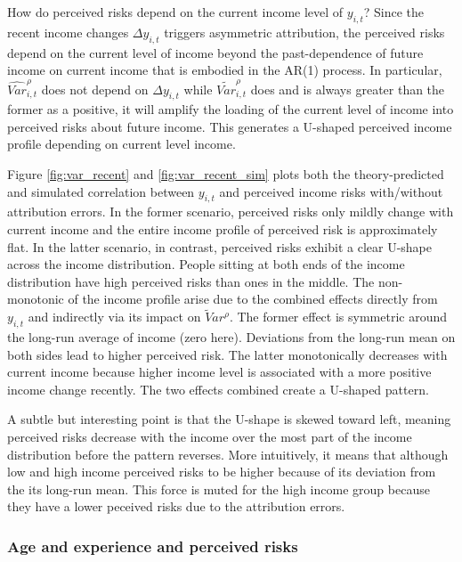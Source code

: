 \documentclass[12pt,notitlepage,onecolumn,aps,pra]{article}
\begin{document}
How do perceived risks depend on the current income level of
\(y_{i,t}\)? Since the recent income changes \(\Delta y_{i,t}\) triggers
asymmetric attribution, the perceived risks depend on the current level
of income beyond the past-dependence of future income on current income
that is embodied in the AR(1) process. In particular,
\(\widehat{Var}^\rho_{i,t}\) does not depend on \(\Delta y_{i,t}\) while
\(\tilde{Var}^\rho_{i,t}\) does and is always greater than the former as
a positive, it will amplify the loading of the current level of income
into perceived risks about future income. This generates a U-shaped
perceived income profile depending on current level income.

Figure \ref{fig:var_recent} and \ref{fig:var_recent_sim} plots both the
theory-predicted and simulated correlation between \(y_{i,t}\) and
perceived income risks with/without attribution errors. In the former
scenario, perceived risks only mildly change with current income and the
entire income profile of perceived risk is approximately flat. In the
latter scenario, in contrast, perceived risks exhibit a clear U-shape
across the income distribution. People sitting at both ends of the
income distribution have high perceived risks than ones in the middle.
The non-monotonic of the income profile arise due to the combined
effects directly from \(y_{i,t}\) and indirectly via its impact on
\(\tilde Var^{\rho}\). The former effect is symmetric around the
long-run average of income (zero here). Deviations from the long-run
mean on both sides lead to higher perceived risk. The latter
monotonically decreases with current income because higher income level
is associated with a more positive income change recently. The two
effects combined create a U-shaped pattern.

A subtle but interesting point is that the U-shape is skewed toward
left, meaning perceived risks decrease with the income over the most
part of the income distribution before the pattern reverses. More
intuitively, it means that although low and high income perceived risks
to be higher because of its deviation from the its long-run mean. This
force is muted for the high income group because they have a lower
peceived risks due to the attribution errors.


    \hypertarget{age-and-experience-and-perceived-risks}{%
\subsubsection{Age and experience and perceived
risks}\label{age-and-experience-and-perceived-risks}}
\end{document}
